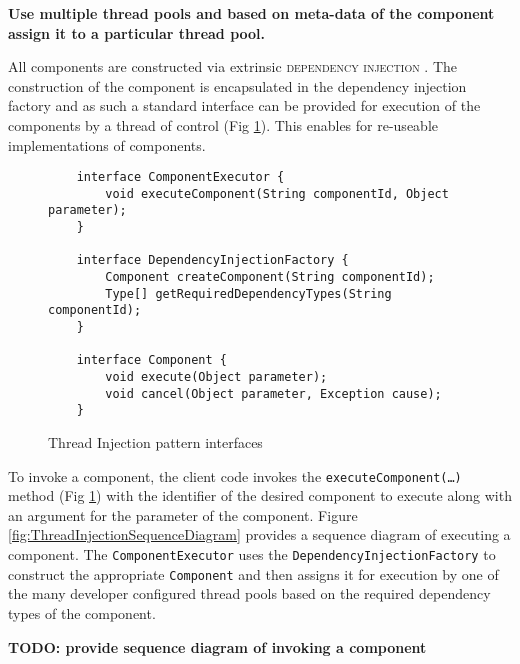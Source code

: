 \documentclass[prodmode]{style/acmlarge}
\begin{document}
\textbf{Use multiple thread pools and based on meta-data of the component assign it to a particular thread pool.}

All components are constructed via extrinsic \textsc{dependency injection}
\cite{ioc}.  The construction of the component is encapsulated in the dependency
injection factory and as such a standard interface can be provided for execution
of the components by a thread of control (Fig
\ref{fig:ThreadInjectionInterfaces}).  This enables for re-useable
implementations of components.

\begin{figure}[tp]
\centering
\begin{verbatim}
    interface ComponentExecutor {
        void executeComponent(String componentId, Object parameter);
    }

    interface DependencyInjectionFactory {
        Component createComponent(String componentId);
        Type[] getRequiredDependencyTypes(String componentId);
    }

    interface Component {
        void execute(Object parameter);
        void cancel(Object parameter, Exception cause);
    }
\end{verbatim}
\caption{Thread Injection pattern interfaces\footnotemark}
\label{fig:ThreadInjectionInterfaces}
\end{figure}

To invoke a component, the client code invokes the
\texttt{executeComponent(\ldots)} method (Fig
\ref{fig:ThreadInjectionInterfaces}) with the identifier of the desired
component to execute along with an argument for the parameter of the component.
Figure \ref{fig:ThreadInjectionSequenceDiagram} provides a sequence diagram of
executing a component.  The \texttt{ComponentExecutor} uses the
\texttt{DependencyInjectionFactory} to construct the appropriate
\texttt{Component} and then assigns it for execution by one of the many
developer configured thread pools based on the required dependency types of the
component.

\textbf{TODO: provide sequence diagram of invoking a component}
\end{document}
